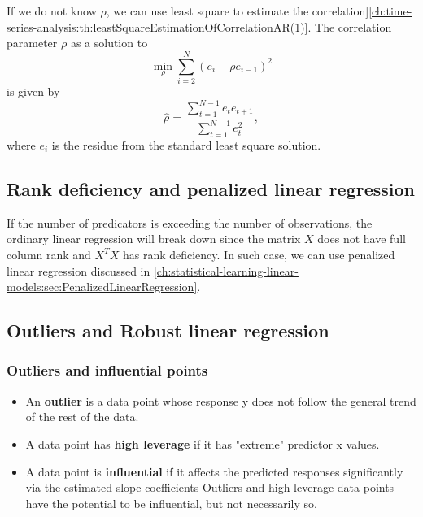 \begin{refsection}
\begin{remark}
\begin{itemize}
\end{itemize}	
	
	
\end{remark}



\begin{remark}\cite[254]{theil1971principles}
If we do not know $\rho$, we can use least square to estimate  the correlation]\autoref{ch:time-series-analysis:th:leastSquareEstimationOfCorrelationAR(1)}.
		The correlation parameter $\rho$ as a solution to	
		$$\min_{\rho} \sum_{i=2}^N (e_i - \rho e_{i-1})^2$$
		is given by
		$$\hat{\rho} = \frac{\sum_{t=1}^{N-1} e_t e_{t+1}}{\sum_{t=1}^{N-1} e_t^2},$$
		where $e_i$ is the residue from the standard least square solution.	
\end{remark}



\subsection{Rank deficiency and penalized linear regression}

If the number of predicators is exceeding the number of observations, the ordinary linear regression will break down since the matrix $X$ does not have full column rank and $X^TX$ has rank deficiency. In such case, we can use penalized linear regression discussed in \autoref{ch:statistical-learning-linear-models:sec:PenalizedLinearRegression}.

\subsection{Outliers and Robust linear regression}

\subsubsection{Outliers and influential points}

\begin{definition}\hfill
\begin{itemize}
	\item An \textbf{outlier} is a data point whose response y does not follow the general trend of the rest of the data.
	\item A data point has \textbf{high leverage} if it has "extreme" predictor x values.
	\item A data point is \textbf{influential} if it affects the predicted responses significantly via the estimated slope coefficients Outliers and high leverage data points have the potential to be influential, but not necessarily so.
\end{itemize}	
\end{definition}



\end{refsection}
